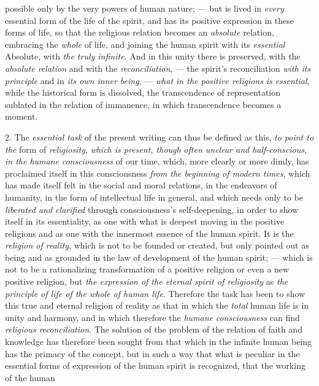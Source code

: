 \documentclass[12pt,a4paper,openany]{book}
\newcommand{\opage}[1]{\marginnote{\footnotesize\textit{[#1]}}}
\begin{document}
possible only by the very powers of human nature; --- but is lived in
\emph{every} essential form of the life of the spirit, and has its positive
expression in these forms of life, so that the religious relation
becomes an \emph{absolute} relation, embracing the \emph{whole} of life,
and joining the human spirit with its \emph{essential}
Absolute, with \emph{the truly infinite}. And in this
unity there is preserved, with the \emph{absolute relation} and with the \emph{reconciliation},
--- the spirit's reconciliation \emph{with its principle} and in
\emph{its own inner being}, --- \emph{what in the positive religions}
\emph{is essential}, while the historical form is dissolved,
the transcendence of representation sublated in the relation of immanence,
in which transcendence becomes a moment.

2. The \emph{essential task} of the present writing can thus be defined as this,
\emph{to point to the} form of \emph{religiosity},
\emph{which is present, though}
\emph{often unclear and half-conscious, in the humane}
\emph{consciousness} of our time, which, more clearly or more dimly, has proclaimed
itself in this consciousness \emph{from the beginning of modern times},
which has made itself felt in the social and moral
relations, in the endeavors of humanity, in the form of intellectual life in general,
and which needs only to be \emph{liberated and clarified}
through consciousness's self-deepening, in order to show itself in
its essentiality, as one with what is deepest moving in the positive religions
and as one with the innermost essence of the human spirit. It is the
\emph{religion of reality}, which is not to be founded or created, but only pointed out as
\setcounter{footnote}{0}%
\opage{219}being and as grounded in the law of development of the human spirit;
--- which is not to be a rationalizing transformation of a positive religion or even a
new positive religion, but
\emph{the expression of the eternal spirit of religiosity}
as \emph{the principle of life of the whole of human life}. Therefore
the task has been to show this true and eternal religion of reality as that in which
the \emph{total} human life is in unity and harmony, and in which therefore the
\emph{humane}
\emph{consciousness} can find \emph{religious reconciliation}. The solution
of the problem of the relation of faith and knowledge has therefore been sought from that which in the infinite human being has the primacy of the concept, but in such a way that what is peculiar in the essential
forms of expression of the human spirit is recognized, that the working of the human
\end{document}
